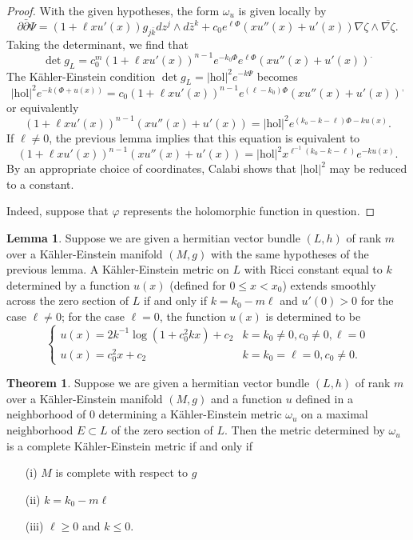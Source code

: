 \documentclass{article}
\numberwithin{equation}{section}
\theoremstyle{definition}
\theoremstyle{theorem}
\newtheorem{theorem}[definition]{Theorem}
\newtheorem{lemma}[definition]{Lemma}
\newcommand{\ddb}{\partial\bar{\partial}}
\begin{document}
\begin{proof}
With the given hypotheses, the form $\omega_u$ is given locally by 
\[
\ddb \Psi = (1 + \ell xu'(x)) g_{j \bar{k}} dz^j \wedge d\bar{z}^k + c_0 e^{\ell \Phi}(x u''(x) + u'(x))  \nabla \zeta \wedge \overline{\nabla \zeta}.
\]
Taking the determinant, we find that 
\[
\det g_L = c_0^m (1 + \ell x u'(x))^{n-1} e^{-k_0 \Phi} e^{ \ell \Phi} (x u''(x) + u'(x))^.
\]
The K\"ahler-Einstein condition $\det g_L = |\text{hol}|^2 e^{-k \Psi}$ becomes 
\[
|\text{hol}|^2 e^{-k(\Phi + u(x))} = c_0 (1 + \ell x u'(x))^{n-1} e^{( \ell - k_0) \Phi} (x u''(x) + u'(x))^,
\]
or equivalently 
\[
(1 + \ell x u'(x))^{n-1}(x u''(x) + u'(x)) = |\text{hol}|^2  e^{(k_o - k -  \ell )\Phi -k u(x)}.
\]
If $\ell \ne 0$, the previous lemma implies that this equation is equivalent to 
\[
(1 + \ell x u'(x))^{n-1} (x u''(x) + u'(x)) = |\text{hol}|^2 x^{\ell^{-1}(k_0 - k - \ell)}e^{-k u(x)}.
\]
By an appropriate choice of coordinates, Calabi shows that $|\text{hol}|^2$ may be reduced to a constant. 

Indeed, suppose that $\varphi$ represents the holomorphic function in question. 
\end{proof}

\begin{lemma}
Suppose we are given a hermitian vector bundle $(L,h)$ of rank $m$ over a K\"ahler-Einstein manifold $(M,g)$ with the same hypotheses of the previous lemma. A K\"ahler-Einstein metric on $L$ with Ricci constant equal to $k$ determined by a function $u(x)$ (defined for $0 \leqslant x < x_0$) extends smoothly across the zero section of $L$ if and only if $k = k_0 - m \ell$ and $u'(0) > 0$ for the case $\ell \ne 0$; for the case $\ell = 0$, the function $u(x)$ is determined to be 
\[
\begin{cases}
u(x) = 2 k^{-1} \log(1 + c_0^2 k x) + c_2 & k = k_0 \ne 0 , c_0 \ne 0, \ell = 0 \\
u(x) = c_0^2x + c_2 & k = k_0 = \ell = 0, c_0 \ne 0.
\end{cases}
\]
\end{lemma}


\begin{theorem}
Suppose we are given a hermitian vector bundle $(L,h)$ of rank $m$ over a K\"ahler-Einstein manifold $(M,g)$ and a function $u$ defined in a neighborhood of $0$ determining a K\"ahler-Einstein metric $\omega_u$ on a maximal neighborhood $E \subset L$ of the zero section of $L$. Then the metric determined by $\omega_u$ is a complete K\"ahler-Einstein metric if and only if 
\begin{enumerate}
\item[(i)] $M$ is complete with respect to $g$
\item[(ii)] $k = k_0 - m \ell$
\item[(iii)] $\ell \geqslant 0$ and $k \leqslant 0$. 
\end{enumerate}

\end{theorem}
\end{document}
